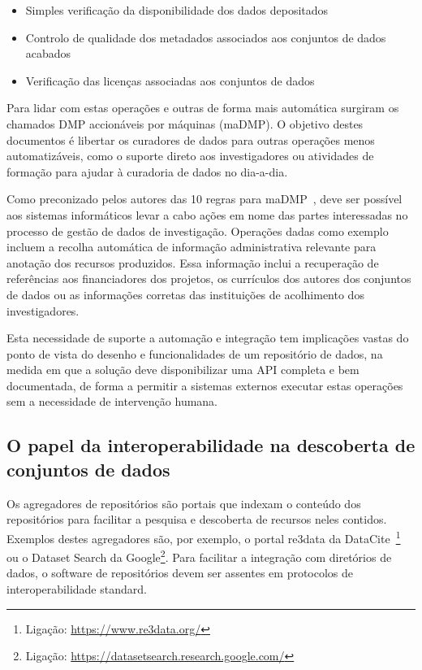 \documentclass[sigconf,nonacm]{acmart}
\begin{document}
\begin{itemize}
    \item Simples verificação da disponibilidade dos dados depositados
    \item Controlo de qualidade dos metadados associados aos conjuntos de dados acabados
    \item Verificação das licenças associadas aos conjuntos de dados
\end{itemize}

Para lidar com estas operações e outras de forma mais automática surgiram os chamados \gls{DMP} accionáveis por máquinas (\gls{maDMP}). O objetivo destes documentos é libertar os curadores de dados para outras operações menos automatizáveis, como o suporte direto aos investigadores ou atividades de formação para ajudar à curadoria de dados no dia-a-dia.

Como preconizado pelos autores das 10 regras para \gls{maDMP}~\cite{miksa_tomasz_2018_1172673}, deve ser possível aos sistemas informáticos levar a cabo ações em nome das partes interessadas no processo de gestão de dados de investigação. Operações dadas como exemplo incluem a recolha automática de informação administrativa relevante para anotação dos recursos produzidos. Essa informação inclui a recuperação de referências aos financiadores dos projetos, os currículos dos autores dos conjuntos de dados ou as informações corretas das instituições de acolhimento dos investigadores.

Esta necessidade de suporte a automação e integração tem implicações vastas do ponto de vista do desenho e funcionalidades de um repositório de dados, na medida em que a solução deve disponibilizar uma \gls{API} completa e bem documentada, de forma a permitir a sistemas externos executar estas operações sem a necessidade de intervenção humana.

\subsection{O papel da interoperabilidade na descoberta de conjuntos de dados} %
\label{sub:o_papel_da_interoperabilidade_na_descoberta_de_conjuntos_de_dados}

Os agregadores de repositórios são portais que indexam o conteúdo dos repositórios para facilitar a pesquisa e descoberta de recursos neles contidos. Exemplos destes agregadores são, por exemplo, o portal re3data da DataCite~\footnote{Ligação: \url{https://www.re3data.org/}} ou o Dataset Search da Google\footnote{Ligação: \url{https://datasetsearch.research.google.com/}}. Para facilitar a integração com diretórios de dados, o software de repositórios devem ser assentes em protocolos de interoperabilidade standard.
\end{document}
